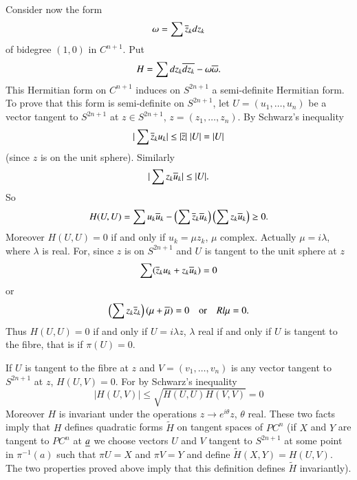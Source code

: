 Consider now the form
$$
\omega=\sum \overline{z}_{k}dz_{k}
$$
of bidegree $(1,0)$ in $C^{n+1}$. Put
$$
H=\sum dz_{k}\overline{dz_{k}}-\omega\overline{\omega}.
$$
This Hermitian form on $C^{n+1}$ induces on $S^{2n+1}$ a semi-definite
Hermitian form. To prove that this form is semi-definite on
$S^{2n+1}$, let $U=(u_{1},\ldots,u_{n})$ be a vector tangent to
$S^{2n+1}$ at $z\in S^{2n+1}$, $z=(z_{1},\ldots,z_{n})$. By Schwarz's
inequality
$$
|\sum \overline{z}_{k}u_{k}|\leq |\overline{z}|\;|U|=|U|
$$
(since $z$ is on the unit sphere). Similarly
$$
|\sum z_{k}\overline{u}_{k}|\leq |U|.
$$
So
$$
H(U,U)=\sum u_{k}\overline{u}_{k}-\left(\sum\overline{z}_{k}\overline{u}_{k}\right)
\left(\sum z_{k}\overline{u}_{k}\right)\geq 0.
$$
Moreover $H(U,U)=0$ if and only if $u_{k}=\mu z_{k}$, $\mu$
complex. Actually $\mu=i\lambda$, where $\lambda$ is real. For, since
$z$ is on $S^{2n+1}$ and $U$ is tangent to the unit sphere at $z$ 
$$
\sum(\overline{z}_{k}u_{k}+z_{k}\overline{u}_{k})=0
$$\pageoriginale
or
$$
\left(\sum z_{k}\overline{z}_{k}\right)(\mu+\overline{\mu})=0\quad\text{or}\quad Rl\mu=0.
$$
Thus $H(U,U)=0$ if and only if $U=i\lambda z$, $\lambda$ real \iec if
and only if $U$ is tangent to the fibre, that is if $\pi(U)=0$.

If $U$ is tangent to the fibre at $z$ and $V=(v_{1},\ldots,v_{n})$ is
any vector tangent to $S^{2n+1}$ at $z$, $H(U,V)=0$. For by Schwarz's
inequality
$$
|H(U,V)|\leq \sqrt{H(U,U)H(V,V)}=0
$$
Moreover $H$ is invariant under the operations $z\to e^{i\theta}z$,
$\theta$ real. These two facts imply that $H$ defines quadratic forms
$\widetilde{H}$ on tangent spaces of $PC^{n}$ (if $X$ and $Y$
are tangent to $PC^{n}$ at $\underline{a}$ we choose vectors $U$ and $V$
tangent to $S^{2n+1}$ at some point in $\pi^{-1}(a)$ such that $\pi
U=X$ and $\pi V=Y$ and define $\widetilde{H}(X,Y)=H(U,V)$. The two
properties proved above imply that this definition defines
$\widetilde{H}$ invariantly).

